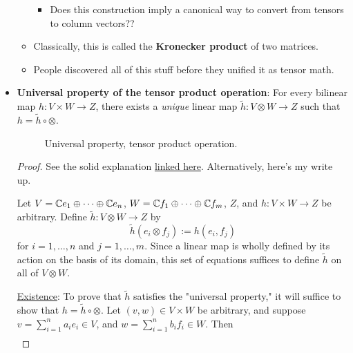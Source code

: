 \documentclass[../notes.tex]{subfiles}
\begin{document}
\begin{itemize}
\begin{itemize}
\begin{itemize}
            \item Does this construction imply a canonical way to convert from tensors to column vectors??
        \end{itemize}
        \item Classically, this is called the \textbf{Kronecker product} of two matrices.
        \item People discovered all of this stuff before they unified it as tensor math.
    \end{itemize}
    \item \textbf{Universal property of the tensor product operation}: For every bilinear map $h:V\times W\to Z$, there exists a \emph{unique} linear map $\tilde{h}:V\otimes W\to Z$ such that $h=\tilde{h}\circ\otimes$.
    \begin{figure}[h!]
        \centering
        \DisableQuotes
        \EnableQuotes
        \vspace{-1.5em}
        \caption{Universal property, tensor product operation.}
        \label{fig:UPtensorProd}
    \end{figure}
    \begin{proof}
        See the solid explanation \href{https://math.stackexchange.com/a/4248460/340652}{linked here}. Alternatively, here's my write up.\par\smallskip
        Let $V=\mathbb{C} e_1\oplus\cdots\oplus\mathbb{C} e_n$, $W=\mathbb{C} f_1\oplus\cdots\oplus\mathbb{C} f_m$, $Z$, and $h:V\times W\to Z$ be arbitrary. Define $\tilde{h}:V\otimes W\to Z$ by
        \begin{equation*}
            \tilde{h}(e_i\otimes f_j) := h(e_i,f_j)
        \end{equation*}
        for $i=1,\dots,n$ and $j=1,\dots,m$. Since a linear map is wholly defined by its action on the basis of its domain, this set of equations suffices to define $\tilde{h}$ on all of $V\otimes W$.\par
        \underline{Existence}: To prove that $\tilde{h}$ satisfies the "universal property," it will suffice to show that $h=\tilde{h}\circ\otimes$. Let $(v,w)\in V\times W$ be arbitrary, and suppose $v=\sum_{i=1}^na_ie_i\in V$, and $w=\sum_{i=1}^nb_if_i\in W$. Then
        \begin{align*}

\end{align*}
\end{proof}
\end{itemize}
\end{document}

